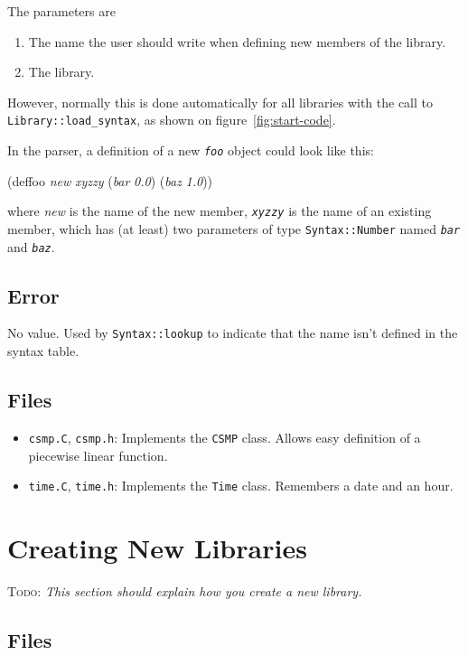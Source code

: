 \documentclass{article}
\newcommand{\code}[1]{\texttt{#1}}
\newcommand{\file}[1]{\texttt{#1}}
\newcommand{\todo}[1]{\textsc{Todo}: \textit{#1}}
\begin{document}
The parameters are
\begin{enumerate}
\item The name the user should write when defining new members of the
  library.
\item The library.
\end{enumerate}

However, normally this is done automatically for all libraries
with the call to \texttt{Library::load\_syntax}, as shown on
figure~\ref{fig:start-code}. 

In the parser, a definition of a new \texttt{\textit{foo}} object
could look like this:
\begin{center}
  \begin{tt}
    (deffoo \textit{new} \textit{xyzzy} 
      (\textit{bar} \textit{0.0}) (\textit{baz} \textit{1.0}))
  \end{tt}
\end{center}
where \textit{new} is the name of the new member,
\texttt{\textit{xyzzy}} is the name of an existing member, which has
(at least) two parameters of type \code{Syntax::Number} named
\texttt{\textit{bar}} and \texttt{\textit{baz}}.
\subsection{Error}

No value.  Used by \code{Syntax::lookup} to indicate that the name
isn't defined in the syntax table.

\subsection{Files}

\begin{itemize}
\item \file{csmp.C}, \file{csmp.h}: Implements the \code{CSMP} class.
  Allows easy definition of a piecewise linear function.
\item \file{time.C}, \file{time.h}: Implements the \code{Time} class.
  Remembers a date and an hour.
\end{itemize}

\section{Creating New Libraries}
\label{new-libraries}

\todo{This section should explain how you create a new library.}

\subsection{Files}
\end{document}
